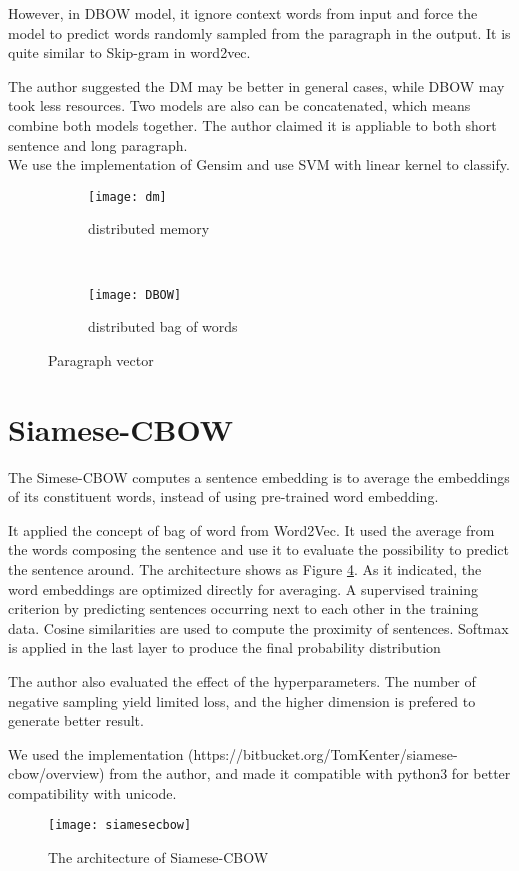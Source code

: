 However, in DBOW model, it ignore context words from input and force the model to predict words randomly sampled from the paragraph in the output.
It is quite similar to Skip-gram in word2vec.

The author suggested the DM may be better in general cases, while DBOW may took less resources. 
Two models are also can be concatenated, which means combine both models together. 
The author claimed it is appliable to  both short sentence and long paragraph.\\

We use the implementation of Gensim and use SVM with linear kernel to classify.

\begin{figure}
\centering
\begin{subfigure}{.5\textwidth}
  \centering
  \texttt{[image: dm]}
  \caption{distributed memory}
  \label{fig:dm}
\end{subfigure}~
\begin{subfigure}{.5\textwidth}
  \centering
  \texttt{[image: DBOW]}
  \caption{distributed bag of words}
  \label{fig:dbow}
\end{subfigure}
\caption{Paragraph vector}
\label{fig:PVDM}
\end{figure}

\section{Siamese-CBOW}

	The Simese-CBOW\cite{kenter2016siamesecbow} computes a sentence embedding is to average the embeddings of its
constituent words, instead of using pre-trained word embedding. 

It applied the concept of bag of word from Word2Vec. It used the average from the words composing the sentence and use it to evaluate the possibility to predict the sentence around. 
The architecture shows as Figure \ref{fig:siamese}. As it indicated, the word embeddings are optimized directly for averaging.
A supervised training criterion by predicting sentences occurring next to each other in the training data.
Cosine similarities are used to compute the proximity of sentences.
Softmax is applied in the last layer to produce the final probability distribution

The author also evaluated the effect of the hyperparameters. The number of negative sampling yield limited loss, and the higher dimension is prefered to generate better result.

We used the implementation (https://bitbucket.org/TomKenter/siamese-cbow/overview) from the author, and made it compatible with python3 for better compatibility with unicode.

\begin{figure}[h]
    \centering
	\texttt{[image: siamesecbow]}
    \caption{The architecture of Siamese-CBOW}
    \label{fig:siamese}
\end{figure}
